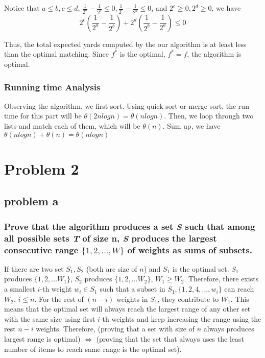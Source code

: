 \documentclass{article}
\begin{document}
        Notice that $a\leq b, c\leq d$, $\frac{1}{2^a}-\frac{1}{2^b} \leq 0, \frac{1}{2^c}-\frac{1}{2^d} \leq 0$, and $2^c \geq 0, 2^d\geq 0$, we have
        \[2^c(\frac{1}{2^a}-\frac{1}{2^b})+2^d(\frac{1}{2^b}-\frac{1}{2^a}) \leq 0\]

        Thus, the total expected yards computed by the our algorithm is at least less than the optimal matching. Since $f^*$ is the optimal, $f^* = f$, the algorithm is optimal.
        \\
        \subsubsection{Running time Analysis} 
        Observing the algorithm, we first sort. Using quick sort or merge sort, the run time for this part will be $\theta(2nlogn) = \theta(nlogn)$. Then, we loop through two lists and match each of them, which will be $\theta(n)$. Sum up, we have $\theta(nlogn)+\theta(n) = \theta(nlogn)$

\section{Problem 2}
    \subsection{problem a}
        \subsubsection{Prove that the algorithm produces a set \textit{S} such that among all possible sets \textit{T} of size n, \textit{S} produces the largest consecutive range $\{1, 2, . . . , W\}$ of weights as sums of subsets.}

        If there are two set $S_1, S_2$ (both are size of $n$) and $S_1$ is the optimal set. $S_1$ produces $\{1,2,...W_1\}$, $S_2$ produces $\{1,2,...W_2\}$, $W_1\geq W_2$. Therefore, there exists a smallest $i$-th weight $w_i \in S_1$ such that a subset in $S_1, \{1,2,4,...,w_i\}$ can reach $W_2$, $i\leq n$. For the rest of $(n-i)$ weights in $S_1$, they contribute to $W_1$. This means that the optimal set will always reach the largest range of any other set with the same size using first $i$-th weights and keep increasing the range using the rest $n-i$ weights. Therefore, (proving that a  set with size of $n$ always produces largest range is optimal) $\Leftrightarrow$ (proving that the set that always uses the least number of items to reach same range is the optimal set).
        
\end{document}
